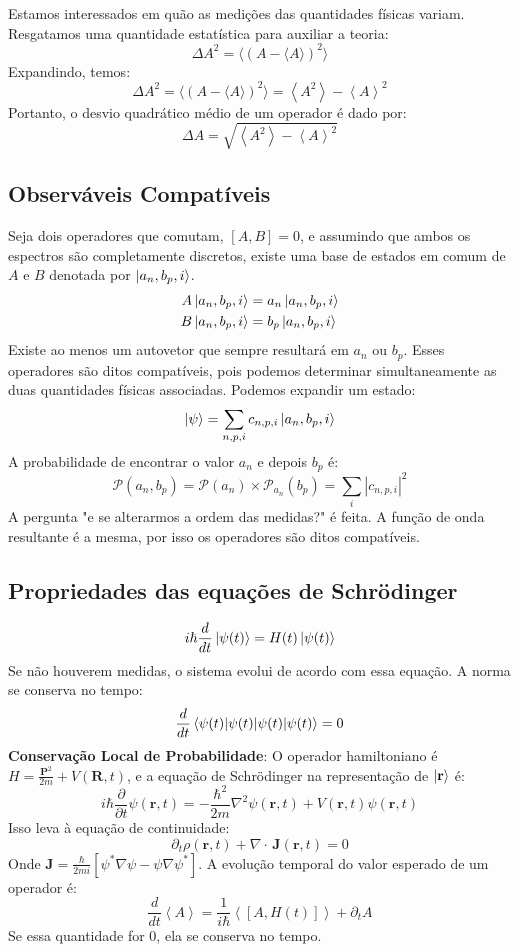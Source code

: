 \documentclass{article}
\begin{document}
	Estamos interessados em quão as medições das quantidades físicas variam. Resgatamos uma quantidade estatística para auxiliar a teoria:
	$$\Delta A^{2}= \langle (A- \langle A\rangle)^{2}\rangle$$Expandindo, temos:$$\Delta A^{2}= \langle (A- \langle A\rangle)^{2}\rangle= \left< A^{2} \right>-\left< A \right>^{2}$$Portanto, o desvio quadrático médio de um operador é dado por:$$
	\Delta A=\sqrt{ \left< A^{2} \right>-\left< A \right>^{2}   }
	$$
	
	\subsection{Observáveis Compatíveis}
	
	Seja dois operadores que comutam, $\left[ A,B \right]=0$, e assumindo que ambos os espectros são completamente discretos, existe uma base de estados em comum de $A$ e $B$ denotada por $\ket{a_{n},b_{p},i}$.
	$$
	\begin{aligned}
		A\ket{a_{n},b_{p},i}&=a_{n}\ket{a_{n},b_{p},i} \\ 
		B\ket{a_{n},b_{p},i}&=b_{p}\ket{a_{n},b_{p},i}
	\end{aligned}
	$$Existe ao menos um autovetor que sempre resultará em $a_{n}$ ou $b_{p}$. Esses operadores são ditos compatíveis, pois podemos determinar simultaneamente as duas quantidades físicas associadas. Podemos expandir um estado:$$
	\ket{\psi}=\sum_{n,p,i}c_{n,p,i}\ket{a_{n},b_{p},i} 
	$$A probabilidade de encontrar o valor $a_{n}$ e depois $b_{p}$ é:$$
	\mathcal{P}(a_{n},b_{p})=\mathcal{P}(a_{n}) \times \mathcal{P}_{a_{n}}(b_{p})=\sum_{i}|c_{n,p,i}|^{2}
	$$
	A pergunta "e se alterarmos a ordem das medidas?" é feita. A função de onda resultante é a mesma, por isso os operadores são ditos compatíveis.
	
	\subsection{Propriedades das equações de Schrödinger}
	
	$$i\hbar \frac{d}{dt}\ket{\psi(t)}=H(t)\ket{\psi(t)}  $$
	Se não houverem medidas, o sistema evolui de acordo com essa equação. A norma se conserva no tempo:
	$$\frac{d}{dt}\braket{ \psi(t) |\psi(t)  }=0$$
	\textbf{Conservação Local de Probabilidade}:
	O operador hamiltoniano é $H= \frac{\mathbf{P}^{2}}{2m}+V(\mathbf{R},t)$, e a equação de Schrödinger na representação de $\ket{\mathbf{r}}$ é:
	$$i\hbar \frac{\partial}{\partial t}\psi(\mathbf{r},t)=-\frac{\hbar^{2}}{2m}\nabla^{2}\psi(\mathbf{r},t)+V(\mathbf{r},t)\psi(\mathbf{r},t)$$
	Isso leva à equação de continuidade:
	$$\partial_{t}\rho(\mathbf{r},t)+\nabla \cdot\,\mathbf{J}(\mathbf{r},t)=0$$
	Onde $\mathbf{J}=\frac{\hbar}{2mi}\left[ \psi^{*}\nabla \psi-\psi \nabla \psi^{*} \right]$.
	A evolução temporal do valor esperado de um operador é:
	$$\frac{d}{dt}\left< A \right> = \frac{1}{i\hbar}\left< \left[ A,H(t) \right]  \right>+\partial_{t}A  $$
	Se essa quantidade for 0, ela se conserva no tempo.
	
\end{document}
